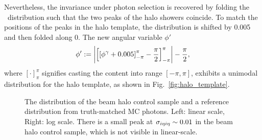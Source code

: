 Nevertheless, the invariance under photon selection is recovered by folding the \phig\ distribution such that the two peaks of the halo showers coincide.
To match the positions of the peaks in the halo template, the distribution is shifted by 0.005 and then folded along 0. 
The new angular variable $\phi'$
\begin{equation}
  \phi' := \left|\left[\left[\phi^{\gamma} + 0.005\right]_{-\pi}^{\pi} - \frac{\pi}{2}\right]_{-\pi}^{\pi}\right| - \frac{\pi}{2},
  \label{eqn:phi}
\end{equation}
where $[\cdot]_{\pi}^{\pi}$ signifies casting the content into range $[-\pi,\pi]$,
exhibits a unimodal distribution for the halo template, as shown in Fig.~\ref{fig:halo_template}.

\begin{figure}[htbp]
  \centering
  \caption{
    The \sieie distribution of the beam halo control sample and a reference distribution from truth-matched MC photons. 
    Left: linear scale, Right: log scale. 
    There is a small peak at $\sigma_{i\eta i\eta} \sim 0.01$ in the beam halo control sample, which is not visible in linear-scale.
  }
  \label{fig:halo_sieie}
\end{figure}

